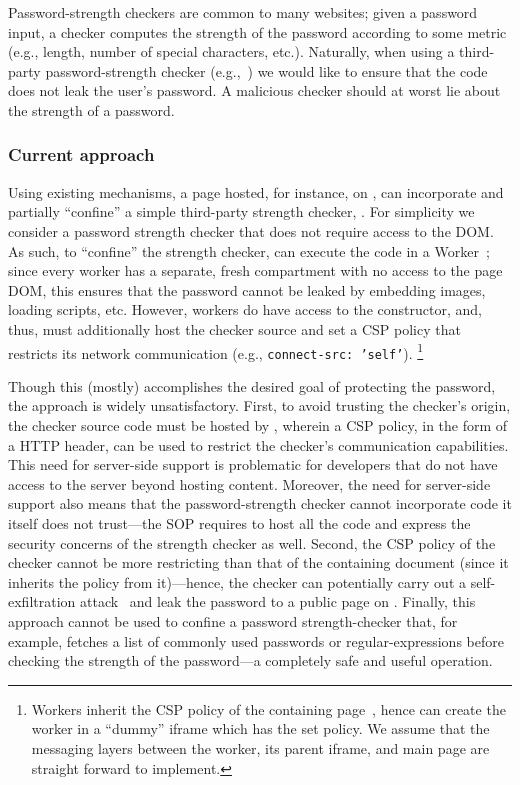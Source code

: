 Password-strength checkers are common to many websites;
%
given a password input, a checker computes the strength of the
password according to some metric (e.g., length, number of special
characters, etc.).
%
Naturally, when using a third-party password-strength checker
(e.g.,~\cite{checker1}) we would like to ensure that the
code does not leak the user's password.
%
A malicious checker should at worst lie about the strength of a
password.

\subsubsection{Current approach}
%
Using existing mechanisms, a page hosted, for instance, on
, can incorporate and partially ``confine'' a
simple third-party strength checker, .
%
For simplicity we consider a password strength checker that does not
require access to the DOM.
%
As such, to ``confine'' the strength checker, 
can execute the code in a Worker~\cite{workers};
%
since every worker has a separate, fresh compartment with no
access to the page DOM, this ensures that the password cannot be
leaked by embedding images, loading scripts, etc.
%
However, workers do have access to the \xhr{} constructor, and, thus,
 must additionally host the checker source and set
a CSP policy that restricts its network communication (e.g.,
\texttt{connect-src: 'self'}).
\footnote{
  Workers inherit the CSP policy of the containing page~\cite{csp},
  hence  can create the worker in a ``dummy''
  iframe which has the set policy.
  We assume that the messaging layers between the worker, its parent
  iframe, and main page are straight forward to implement.
}
%

Though this (mostly) accomplishes the desired goal of
protecting the password, the approach is widely unsatisfactory.
%
First, to avoid trusting the checker's origin, the checker source code
must be hosted by , wherein a CSP policy, in the
form of a HTTP  header, can be used to restrict the checker's
communication capabilities. 
%
This need for server-side support is problematic for developers that
do not have access to the server beyond hosting content.
%
Moreover, the need for server-side support also means that the
password-strength checker cannot incorporate code it itself does not
trust---the SOP requires  to host all the code
and express the security concerns of the strength checker as well.
%
Second, the CSP policy of the checker cannot be more restricting than
that of the containing document (since it inherits the policy from
it)---hence, the checker can potentially carry out a self-exfiltration
attack~\cite{selfex} and leak the password to a public
page on .
%
Finally, this approach cannot be used to confine a password
strength-checker that, for example, fetches a list of commonly used
passwords or regular-expressions before checking the strength of the
password---a completely safe and useful operation.
%

